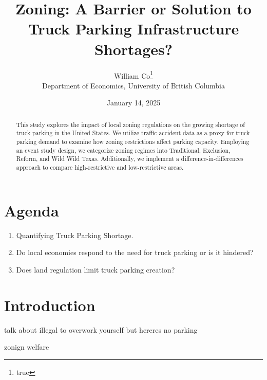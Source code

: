 \documentclass[
  12pt]{article}
\begin{document}
\def\spacingset#1{\renewcommand{\baselinestretch}%
{#1}\small\normalsize} \spacingset{1}



\date{January 14, 2025}
\title{\bf Zoning: A Barrier or Solution to Truck Parking Infrastructure
Shortages?}
\author{
William Co\thanks{true}\\
Department of Economics, University of British Columbia\\
}
\maketitle

\bigskip
\bigskip
\begin{abstract}
This study explores the impact of local zoning regulations on the
growing shortage of truck parking in the United States. We utilize
traffic accident data as a proxy for truck parking demand to examine how
zoning restrictions affect parking capacity. Employing an event study
design, we categorize zoning regimes into Traditional, Exclusion,
Reform, and Wild Wild Texas. Additionally, we implement a
difference-in-differences approach to compare high-restrictive and
low-restrictive areas.
\end{abstract}


\newpage
\spacingset{1.9} %

\section{Agenda}\label{agenda}

\begin{enumerate}
\def\labelenumi{\arabic{enumi}.}
\item
  Quantifying Truck Parking Shortage.~
\item
  Do local economies respond to the need for truck parking or is it
  hindered?
\item
  Does land regulation limit truck parking creation?
\end{enumerate}

\section{Introduction}\label{sec-intro}

talk about illegal to overwork yourself but hereres no parking

zonign welfare
\end{document}
